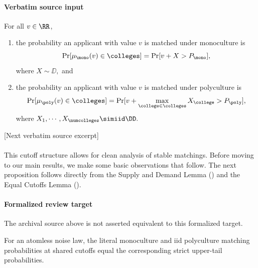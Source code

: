 \documentclass[10pt]{article}
\begin{document}
\paragraph{Verbatim source input}
\begin{ReviewVerbatim}
\begin{proposition}\label{prop:prob-match}
    For all $v \in \RR$,
    \begin{enumerate}
    \item[(i)] the probability an applicant with value $v$ is matched under monoculture is
\begin{equation}\label{eq:match-mono}
    \Pr[\mu_{\mono}(v) \in \colleges] = \Pr[v + X > P_{\mono}],
\end{equation}
where $X\sim \DD,$ and
\item[(ii)] the probability an applicant with value $v$ is matched under polyculture is
\begin{equation}\label{eq:match-poly}
        \Pr[\mu_{\poly}(v) \in \colleges] = \Pr[v + \max_{\college\in \colleges} X_\college > P_{\poly}],
    \end{equation}
    where $X_1,\cdots, X_\numcolleges\simiid \DD.$
\end{enumerate}
\end{proposition}

[Next verbatim source excerpt]


\paragraph{}
This cutoff structure allows for clean analysis of stable matchings. Before moving to our main results, we make some basic observations that follow. The next proposition follows directly from the Supply and Demand Lemma () and the Equal Cutoffs Lemma ().
\end{ReviewVerbatim}


\paragraph{Formalized review target}
The archival source above is not asserted equivalent to this formalized target.
\begin{ReviewVerbatim}
For an atomless noise law, the literal monoculture and iid polyculture matching probabilities at shared cutoffs equal the corresponding strict upper-tail probabilities.
\end{ReviewVerbatim}
\end{document}
